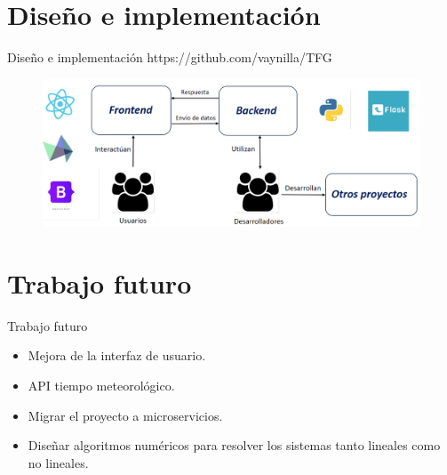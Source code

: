 \documentclass{beamer}
\begin{document}
\section{Diseño e implementación}
\begin{frame}{Diseño e implementación}
	\centering
	https://github.com/vaynilla/TFG
\begin{figure}[h!]
	\centering
	\includegraphics[width=\textwidth]{diagrama}
\end{figure}
\end{frame}
\section{Trabajo futuro}
\begin{frame}{Trabajo futuro}
\begin{itemize}
	\item Mejora de la interfaz de usuario.
	\item API tiempo meteorológico.
	\item Migrar el proyecto a microservicios.
	\item Diseñar algoritmos numéricos para resolver los sistemas tanto lineales como no lineales.
\end{itemize}
\end{frame}
\end{document}
